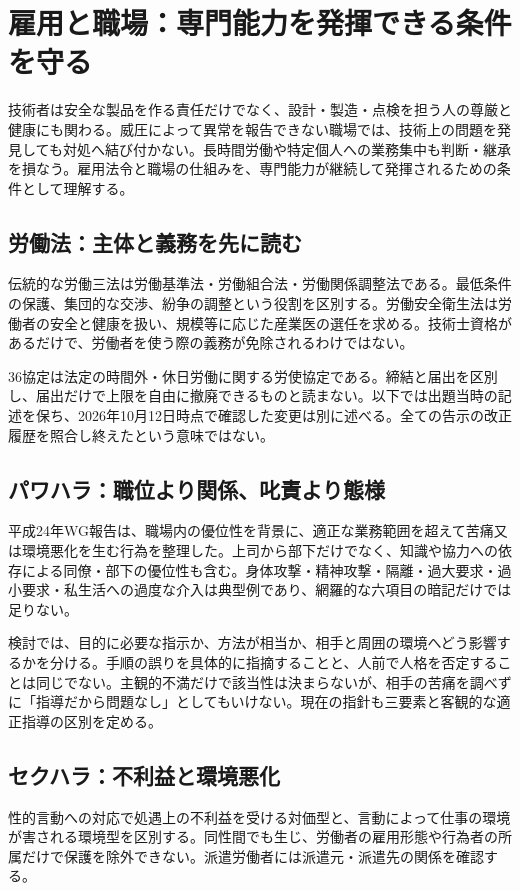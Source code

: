 \section{雇用と職場：専門能力を発揮できる条件を守る}
\label{theory:employment:background}
技術者は安全な製品を作る責任だけでなく、設計・製造・点検を担う人の尊厳と健康にも関わる。威圧によって異常を報告できない職場では、技術上の問題を発見しても対処へ結び付かない。長時間労働や特定個人への業務集中も判断・継承を損なう。雇用法令と職場の仕組みを、専門能力が継続して発揮されるための条件として理解する。

\subsection{労働法：主体と義務を先に読む}
\label{theory:employment:law}
伝統的な労働三法は労働基準法・労働組合法・労働関係調整法である\parencite{employment_labor_three}。最低条件の保護、集団的な交渉、紛争の調整という役割を区別する。労働安全衛生法は労働者の安全と健康を扱い、規模等に応じた産業医の選任を求める\parencite{employment_industrial_physician}。技術士資格があるだけで、労働者を使う際の義務が免除されるわけではない。

36協定は法定の時間外・休日労働に関する労使協定である。締結と届出を区別し、届出だけで上限を自由に撤廃できるものと読まない\parencite{employment_overtime}。以下では出題当時の記述を保ち、2026年10月12日時点で確認した変更は別に述べる。全ての告示の改正履歴を照合し終えたという意味ではない。

\subsection{パワハラ：職位より関係、叱責より態様}
\label{theory:employment:power}
平成24年WG報告は、職場内の優位性を背景に、適正な業務範囲を超えて苦痛又は環境悪化を生む行為を整理した。上司から部下だけでなく、知識や協力への依存による同僚・部下の優位性も含む。身体攻撃・精神攻撃・隔離・過大要求・過小要求・私生活への過度な介入は典型例であり、網羅的な六項目の暗記だけでは足りない\parencite{employment_power2012}。

検討では、目的に必要な指示か、方法が相当か、相手と周囲の環境へどう影響するかを分ける。手順の誤りを具体的に指摘することと、人前で人格を否定することは同じでない。主観的不満だけで該当性は決まらないが、相手の苦痛を調べずに「指導だから問題なし」としてもいけない。現在の指針も三要素と客観的な適正指導の区別を定める\parencite{employment_power_current}。

\subsection{セクハラ：不利益と環境悪化}
\label{theory:employment:sexual}
性的言動への対応で処遇上の不利益を受ける対価型と、言動によって仕事の環境が害される環境型を区別する。同性間でも生じ、労働者の雇用形態や行為者の所属だけで保護を除外できない。派遣労働者には派遣元・派遣先の関係を確認する\parencite{employment_sexual_current}。

